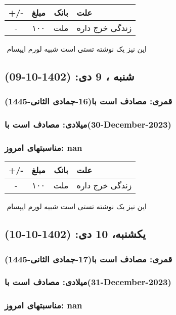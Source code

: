 \documentclass{article}
\newcommand{\rnote}[1]{\marginpar{\textcolor{color}{\StrSubstitute{\##1}{ }{\_}}}}
\newcommand{\myRow}[4]{
    #1 & #2 & #3 & #4 \\ \hline
}
\begin{document}
\begin{tabular}{ | c | c | c | p{5cm} |}
    \hline
    \myRow{ +/- }{مبلغ}{بانک}{علت}
    \myRow{-}{۱۰۰}{ملت}{زندگی خرج داره}
\end{tabular}
\newline
\newline

‌
\rnote{تست}
این نیز یک نوشته تستی است شبیه لورم ایپسام




\newpage
{}
\textcolor{color}{
\section{ شنبه ، 9 دی: (1402-10-09) }
\subsubsection*{قمری: مصادف است با(16-جمادی الثانی-1445)} 
\subsubsection*{میلادی: مصادف است با(30-December-2023)}
\subsubsection*{مناسبتهای امروز: nan}
}


\begin{tabular}{ | c | c | c | p{5cm} |}
    \hline
    \myRow{ +/- }{مبلغ}{بانک}{علت}
    \myRow{-}{۱۰۰}{ملت}{زندگی خرج داره}
\end{tabular}
\newline
\newline

‌
\rnote{تست}
این نیز یک نوشته تستی است شبیه لورم ایپسام




\newpage
{}
\textcolor{color}{
\section{ یکشنبه، 10 دی: (1402-10-10) }
\subsubsection*{قمری: مصادف است با(17-جمادی الثانی-1445)} 
\subsubsection*{میلادی: مصادف است با(31-December-2023)}
\subsubsection*{مناسبتهای امروز: nan}
}
\end{document}
